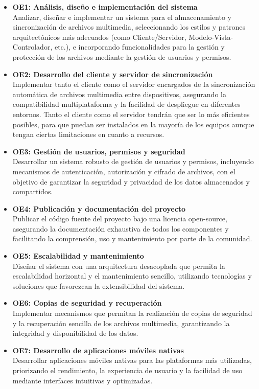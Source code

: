 \begin{itemize}
    \item \textbf{OE1: Análisis, diseño e implementación del sistema} \\
    Analizar, diseñar e implementar un sistema para el almacenamiento y sincronización de archivos multimedia, seleccionando los estilos y patrones arquitectónicos más adecuados (como Cliente/Servidor, Modelo-Vista-Controlador, etc.), e incorporando funcionalidades para la gestión y protección de los archivos mediante la gestión de usuarios y permisos.

    \item \textbf{OE2: Desarrollo del cliente y servidor de sincronización} \\
    Implementar tanto el cliente como el servidor encargados de la sincronización automática de archivos multimedia entre dispositivos, asegurando la compatibilidad multiplataforma y la facilidad de despliegue en diferentes entornos.
    Tanto el cliente como el servidor tendrán que ser lo más eficientes posibles, para que puedan ser instalados en la mayoría de los equipos aunque tengan ciertas limitaciones en cuanto a recursos.

    \item \textbf{OE3: Gestión de usuarios, permisos y seguridad} \\
    Desarrollar un sistema robusto de gestión de usuarios y permisos, incluyendo mecanismos de autenticación, autorización y cifrado de archivos, con el objetivo de garantizar la seguridad y privacidad de los datos almacenados y compartidos.

    \item \textbf{OE4: Publicación y documentación del proyecto} \\
    Publicar el código fuente del proyecto bajo una licencia open-source, asegurando la documentación exhaustiva de todos los componentes y facilitando la comprensión, uso y mantenimiento por parte de la comunidad.

    \item \textbf{OE5: Escalabilidad y mantenimiento} \\
    Diseñar el sistema con una arquitectura desacoplada que permita la escalabilidad horizontal y el mantenimiento sencillo, utilizando tecnologías y soluciones que favorezcan la extensibilidad del sistema.

    \item \textbf{OE6: Copias de seguridad y recuperación} \\
    Implementar mecanismos que permitan la realización de copias de seguridad y la recuperación sencilla de los archivos multimedia, garantizando la integridad y disponibilidad de los datos.

    \item \textbf{OE7: Desarrollo de aplicaciones móviles nativas} \\
    Desarrollar aplicaciones móviles nativas para las plataformas más utilizadas, priorizando el rendimiento, la experiencia de usuario y la facilidad de uso mediante interfaces intuitivas y optimizadas.
\end{itemize}


